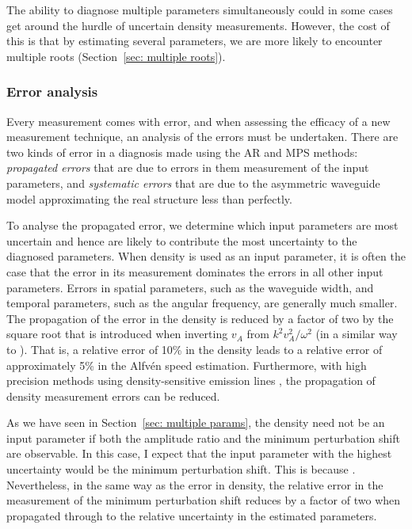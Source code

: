 The ability to diagnose multiple parameters simultaneously could in some cases get around the hurdle of uncertain density measurements. However, the cost of this is that by estimating several parameters, we are more likely to encounter multiple roots (Section~\ref{sec: multiple roots}).


\subsubsection{Error analysis}

Every measurement comes with error, and when assessing the efficacy of a new measurement technique, an analysis of the errors must be undertaken. There are two kinds of error in a diagnosis made using the AR and MPS methods: \textit{propagated errors} that are due to errors in them measurement of the input parameters, and \textit{systematic errors} that are due to the asymmetric waveguide model approximating the real structure less than perfectly.

To analyse the propagated error, we determine which input parameters are most uncertain and hence are likely to contribute the most uncertainty to the diagnosed parameters. When density is used as an input parameter, it is often the case that the error in its measurement dominates the errors in all other input parameters. Errors in spatial parameters, such as the waveguide width, and temporal parameters, such as the angular frequency, are generally much smaller. The propagation of the error in the density is reduced by a factor of two by the square root that is introduced when inverting $v_A$ from $k^2v_A^2/\omega^2$ (in a similar way to \citealp{nak_etal01}). That is, a relative error of 10\% in the density leads to a relative error of approximately 5\% in the Alfv\'{e}n speed estimation. Furthermore, with high precision methods using density-sensitive emission lines \citep{you_etal09}, the propagation of density measurement errors can be reduced.

As we have seen in Section~\ref{sec: multiple params}, the density need not be an input parameter if both the amplitude ratio and the minimum perturbation shift are observable. In this case, I expect that the input parameter with the highest uncertainty would be the minimum perturbation shift. This is because . Nevertheless, in the same way as the error in density, the relative error in the measurement of the minimum perturbation shift reduces by a factor of two when propagated through to the relative uncertainty in the estimated parameters.

